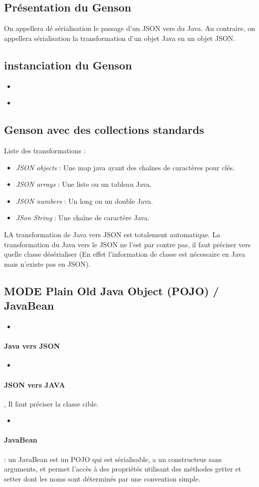 \documentclass{article}[12pt]
\newcommand{\JavaScript}[2]{
	\begin{itemize}
		\item[]
	\end{itemize}
}
\begin{document}
\subsection{Présentation du Genson}
On appellera dé sérialisation le passage d'un JSON vers du Java. Au contraire, on appellera sérialisation la transformation d'un objet Java en un objet JSON.
\subsection{instanciation du Genson}
\JavaScript{genson_direct}{Directement}
\JavaScript{genson_builder}{Via un builder pour une configuration plus précise}
\subsection{Genson avec des collections standards}
Liste des transformations : 
\begin{itemize}
	\item \emph{JSON objects} : Une map java ayant des chaînes de caractères pour clés.
    \item \emph{JSON arrays} : Une liste ou un tableau Java.
    \item \emph{JSON numbers} : Un long ou un double Java.
    \item \emph{JSon String} : Une chaîne de caractère Java.
\end{itemize}
LA transformation de Java vers JSON est totalement automatique. La transformation du Java vers le JSON ne l'est par contre pas, il faut préciser vers quelle classe désérialiser (En effet l'information de classe est nécessaire en Java mais n'existe pas en JSON). 
\subsection{MODE Plain Old Java Object (POJO) / JavaBean}
\JavaScript{pojo}{Exemple de POJO}
\paragraph{Java vers JSON}
\JavaScript{java_json}{Transformation Java vers JSON}
\paragraph{JSON vers JAVA}, Il faut préciser la classe cible.
\JavaScript{json_java}{Transformation JSON vers Java}
\paragraph{JavaBean} : un JavaBean est un POJO qui est sérialisable, a un constructeur sans arguments, et permet l'accès à des propriétés utilisant des méthodes getter et setter dont les noms sont déterminés par une convention simple.
\end{document}
